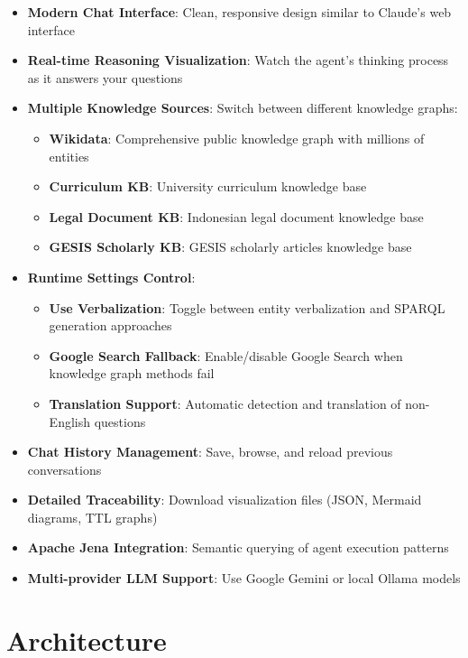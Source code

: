 \begin{itemize}
    \item \textbf{Modern Chat Interface}: Clean, responsive design similar to Claude's web interface
    \item \textbf{Real-time Reasoning Visualization}: Watch the agent's thinking process as it answers your questions
    \item \textbf{Multiple Knowledge Sources}: Switch between different knowledge graphs:
    \begin{itemize}
        \item \textbf{Wikidata}: Comprehensive public knowledge graph with millions of entities
        \item \textbf{Curriculum KB}: University curriculum knowledge base
        \item \textbf{Legal Document KB}: Indonesian legal document knowledge base
        \item \textbf{GESIS Scholarly KB}: GESIS scholarly articles knowledge base
    \end{itemize}
    \item \textbf{Runtime Settings Control}:
    \begin{itemize}
        \item \textbf{Use Verbalization}: Toggle between entity verbalization and SPARQL generation approaches
        \item \textbf{Google Search Fallback}: Enable/disable Google Search when knowledge graph methods fail
        \item \textbf{Translation Support}: Automatic detection and translation of non-English questions
    \end{itemize}
    \item \textbf{Chat History Management}: Save, browse, and reload previous conversations
    \item \textbf{Detailed Traceability}: Download visualization files (JSON, Mermaid diagrams, TTL graphs)
    \item \textbf{Apache Jena Integration}: Semantic querying of agent execution patterns
    \item \textbf{Multi-provider LLM Support}: Use Google Gemini or local Ollama models
\end{itemize}

\section*{Architecture}

